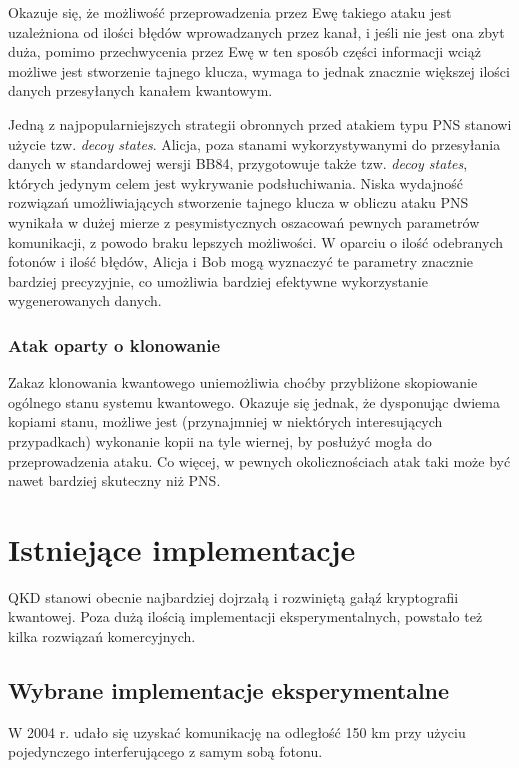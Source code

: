 \documentclass[10pt]{article}
\begin{document}
Okazuje się, że możliwość przeprowadzenia przez Ewę takiego ataku jest uzależniona od ilości błędów
wprowadzanych przez kanał, i jeśli nie jest ona zbyt duża, pomimo przechwycenia przez Ewę w ten 
sposób części informacji wciąż możliwe jest stworzenie tajnego klucza\cite{Inamori07}, wymaga to
jednak znacznie większej ilości danych przesyłanych kanałem kwantowym.

Jedną z najpopularniejszych strategii obronnych przed atakiem typu PNS stanowi użycie tzw. 
\emph{decoy states}\cite{Lo05,Ma05}. Alicja, poza stanami wykorzystywanymi do przesyłania danych
w standardowej wersji BB84, przygotowuje także tzw. \emph{decoy states}, których jedynym celem
jest wykrywanie podsłuchiwania. Niska wydajność rozwiązań umożliwiających stworzenie tajnego klucza
w obliczu ataku PNS wynikała w dużej mierze z pesymistycznych oszacowań pewnych parametrów
komunikacji, z powodo braku lepszych możliwości. W oparciu o ilość odebranych fotonów i ilość błędów,
Alicja i Bob mogą wyznaczyć te parametry znacznie bardziej precyzyjnie, co umożliwia bardziej
efektywne wykorzystanie wygenerowanych danych.


\subsubsection*{Atak oparty o klonowanie}

Zakaz klonowania kwantowego uniemożliwia choćby przybliżone skopiowanie ogólnego stanu systemu
kwantowego. Okazuje się jednak, że dysponując dwiema kopiami stanu, możliwe jest (przynajmniej w 
niektórych interesujących przypadkach) wykonanie kopii na tyle wiernej, by posłużyć mogła do
przeprowadzenia ataku\cite{Acin04}. Co więcej, w pewnych okolicznościach atak taki może być nawet
bardziej skuteczny niż PNS\cite{Niederberger05}.


\section{Istniejące implementacje}

QKD stanowi obecnie najbardziej dojrzałą i rozwiniętą gałąź kryptografii kwantowej. Poza dużą
ilością implementacji eksperymentalnych, powstało też kilka rozwiązań komercyjnych.

\subsection{Wybrane implementacje eksperymentalne}

W 2004 r. udało się uzyskać komunikację na odległość 150 km przy użyciu pojedynczego interferującego
z samym sobą fotonu\cite{Kimura04}.
\end{document}
